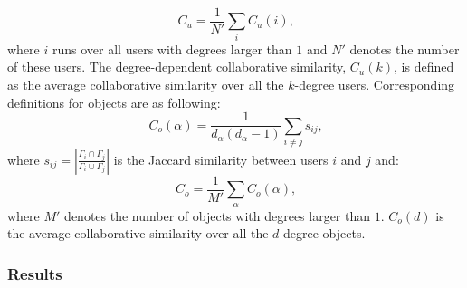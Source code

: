       $$C_u = \frac{1}{N\prime} \sum_{i} C_u(i)\mbox{,}$$
      where $i$ runs over all users with degrees larger than $1$ and $N\prime$ denotes the number of these users. The degree-dependent collaborative similarity, $C_u(k)$, is defined as the average collaborative similarity over all the $k$-degree users. Corresponding definitions for objects are as following:
      $$C_o(\alpha) = \frac{1}{d_\alpha(d_\alpha-1)} \sum_{i\neq j} s_{ij}\mbox{,}$$
      where $s_{ij} = \left| \frac{\Gamma_i \cap \Gamma_j}{\Gamma_i \cup \Gamma_j} \right|$ is the Jaccard similarity between users $i$ and $j$ and:
      $$C_o = \frac{1}{M\prime} \sum_\alpha C_o(\alpha)\mbox{,}$$
      where $M\prime$ denotes the number of objects with degrees larger than $1$. $C_o(d)$ is the average collaborative similarity over all the $d$-degree objects.
      
    \subsubsection{Results}
    
